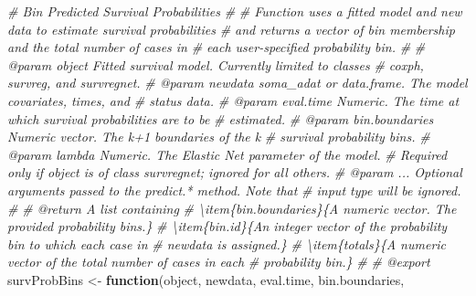 \documentclass[
]{book}
\newenvironment{Shaded}{\begin{snugshade}}{\end{snugshade}}
\newcommand{\CommentTok}[1]{\textcolor[rgb]{0.56,0.35,0.01}{\textit{#1}}}
\newcommand{\ControlFlowTok}[1]{\textcolor[rgb]{0.13,0.29,0.53}{\textbf{#1}}}
\newcommand{\NormalTok}[1]{#1}
\newcommand{\OtherTok}[1]{\textcolor[rgb]{0.56,0.35,0.01}{#1}}
\begin{document}
\begin{Shaded}
\begin{Highlighting}[]
\CommentTok{\#\textquotesingle{} Bin Predicted Survival Probabilities}
\CommentTok{\#\textquotesingle{} }
\CommentTok{\#\textquotesingle{} Function uses a fitted model and new data to estimate survival probabilities}
\CommentTok{\#\textquotesingle{}   and returns a vector of bin membership and the total number of cases in}
\CommentTok{\#\textquotesingle{}   each user{-}specified probability bin.}
\CommentTok{\#\textquotesingle{}   }
\CommentTok{\#\textquotesingle{} @param object Fitted survival model. Currently limited to classes}
\CommentTok{\#\textquotesingle{}   \textasciigrave{}coxph\textasciigrave{}, \textasciigrave{}survreg\textasciigrave{}, and \textasciigrave{}survregnet\textasciigrave{}.}
\CommentTok{\#\textquotesingle{} @param newdata soma\_adat or data.frame. The model covariates, times, and}
\CommentTok{\#\textquotesingle{}   status data.}
\CommentTok{\#\textquotesingle{} @param eval.time Numeric. The time at which survival probabilities are to be}
\CommentTok{\#\textquotesingle{}   estimated.}
\CommentTok{\#\textquotesingle{} @param bin.boundaries Numeric vector. The k+1 boundaries of the k}
\CommentTok{\#\textquotesingle{}   survival probability bins.}
\CommentTok{\#\textquotesingle{} @param lambda Numeric. The Elastic Net parameter of the model. }
\CommentTok{\#\textquotesingle{}   Required only if \textasciigrave{}object\textasciigrave{} is of class \textasciigrave{}survregnet\textasciigrave{}; ignored for all others.}
\CommentTok{\#\textquotesingle{} @param ... Optional arguments passed to the \textasciigrave{}predict.*\textasciigrave{} method. Note that}
\CommentTok{\#\textquotesingle{}   input \textasciigrave{}type\textasciigrave{} will be ignored.}
\CommentTok{\#\textquotesingle{} }
\CommentTok{\#\textquotesingle{} @return A list containing}
\CommentTok{\#\textquotesingle{} \textbackslash{}item\{bin.boundaries\}\{A numeric vector. The provided probability bins.\}}
\CommentTok{\#\textquotesingle{} \textbackslash{}item\{bin.id\}\{An integer vector of the probability bin to which each case in }
\CommentTok{\#\textquotesingle{}   \textasciigrave{}newdata\textasciigrave{} is assigned.\}}
\CommentTok{\#\textquotesingle{} \textbackslash{}item\{totals\}\{A numeric vector of the total number of cases in each }
\CommentTok{\#\textquotesingle{}   probability bin.\}}
\CommentTok{\#\textquotesingle{} }
\CommentTok{\#\textquotesingle{} @export}
\NormalTok{survProbBins }\OtherTok{\textless{}{-}} \ControlFlowTok{function}\NormalTok{(object, newdata, eval.time, bin.boundaries, }

\end{Highlighting}
\end{Shaded}
\end{document}
